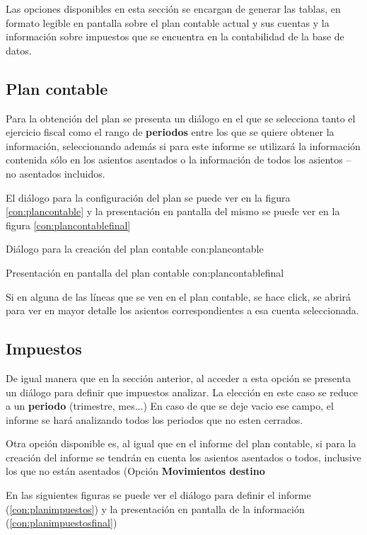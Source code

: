 Las opciones disponibles  en esta sección se encargan de generar las tablas, en formato legible en pantalla sobre el plan contable actual y sus cuentas y la información sobre impuestos que se encuentra en la contabilidad de la base de datos.

\subsection{Plan contable}

Para la obtención del plan se presenta un diálogo en el que se selecciona tanto el ejercicio fiscal como el rango de \textbf{periodos} entre los que se quiere obtener la información, seleccionando además si para este informe se utilizará la información contenida sólo en los
asientos asentados o la información de todos los asientos -- no asentados incluidos.

El diálogo para la configuración del plan se puede ver en la figura \ref{con:plancontable} y la presentación en pantalla del mismo se puede ver en la figura \ref{con:plancontablefinal}

{Diálogo para la creación del plan contable}
{con:plancontable}

{Presentación en pantalla del plan contable}
{con:plancontablefinal}

Si en alguna de las líneas que se ven en el plan contable, se hace click, se abrirá para ver en mayor detalle los asientos correspondientes a esa cuenta seleccionada.

\subsection{Impuestos}

De igual manera que en la sección anterior, al acceder a esta opción se presenta un diálogo para definir que impuestos analizar. La elección en este caso se reduce a un \textbf{periodo} (trimestre, mes...) En caso de que se deje vacio ese campo, el informe se hará  analizando todos los periodos que no esten cerrados.

Otra opción disponible es, al igual que en el informe del plan contable, si para la creación del informe se tendrán en cuenta los asientos asentados o todos, inclusive los que no están asentados (Opción \textbf{Movimientos destino}

En las siguientes figuras se puede ver el diálogo para definir el informe (\ref{con:planimpuestos}) y la presentación en pantalla de la información (\ref{con:planimpuestosfinal})

